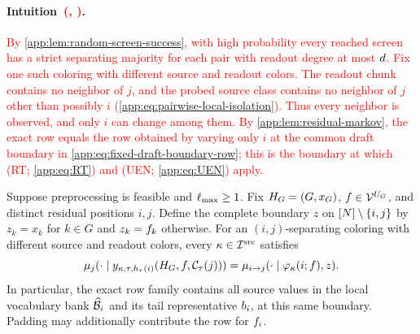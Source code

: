 \paragraph{Intuition\textcolor{red}{~(, )}.}
\textcolor{red}{By \cref{app:lem:random-screen-success}, with high probability
every reached screen has a strict separating majority for each pair with
readout degree at most $\DegreeCutoff$.
Fix one such coloring with different source and readout colors.
The readout chunk contains no neighbor of $j$, and the probed source class
contains no neighbor of $j$ other than possibly $i$
(\cref{app:eq:pairwise-local-isolation}).
Thus every neighbor is observed, and only $i$ can change among them.
By \cref{app:lem:residual-markov}, the exact row equals the row obtained by
varying only $i$ at the common draft boundary in
\cref{app:eq:fixed-draft-boundary-row}; this is the boundary at which
(RT; \cref{app:eq:RT}) and (UEN; \cref{app:eq:UEN}) apply.}

\begin{lemma}
\label{app:lem:fixed-draft-rows}
Suppose preprocessing is feasible and $\MaxBankSize\ge1$.
Fix $\History=(G,x_G)$, $\DraftFiller\in\Vocab^{\ResidualPositions}$, and
distinct residual positions $i,j$.  Define the complete boundary $z$ on
$\PositionSet\setminus\{i,j\}$ by $z_k=x_k$ for $k\in G$ and
$z_k=\DraftToken{k}$ otherwise.  For an $(i,j)$-separating coloring with
different source and readout colors, every $\kappa\in\ScreenColumnSet$
satisfies
\begin{equation}
 \ExactRow{
   \ProbeState{\kappa}{\tau}{\ColorHash{\tau}{i}}
              {\ReadoutChunkOf{\tau}{j}}}{j}
 =\BoundaryRow{i}{j}{\PackedColumn{\kappa}{i}}{z}.
 \label{app:eq:fixed-draft-boundary-row}
\end{equation}
In particular, the exact row family contains all source values in the
local vocabulary bank $\TokenBank{i}$ and its tail representative
$\TailRepresentative{i}$, at this same boundary.
Padding may additionally contribute the row for $\DraftToken{i}$.
\end{lemma}

